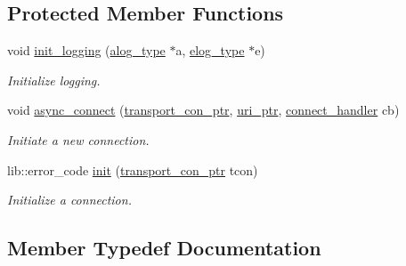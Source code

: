 \subsection*{Protected Member Functions}
\begin{DoxyCompactItemize}
\item 
void \mbox{\hyperlink{classwebsocketpp_1_1transport_1_1iostream_1_1endpoint_a0c3fbf85313521d6d3a9a53faa2084ae}{init\+\_\+logging}} (\mbox{\hyperlink{classwebsocketpp_1_1transport_1_1iostream_1_1endpoint_af176dc3a44caefab71de271c27873c81}{alog\+\_\+type}} $\ast$a, \mbox{\hyperlink{classwebsocketpp_1_1transport_1_1iostream_1_1endpoint_a0aafebd80866c13bef4caa45e48a8ede}{elog\+\_\+type}} $\ast$e)
\begin{DoxyCompactList}\small\item\em Initialize logging. \end{DoxyCompactList}\item 
void \mbox{\hyperlink{classwebsocketpp_1_1transport_1_1iostream_1_1endpoint_a72e24fecb98d0445eb7df64d6b94a6a8}{async\+\_\+connect}} (\mbox{\hyperlink{classwebsocketpp_1_1transport_1_1iostream_1_1endpoint_a709bba4a4e1e2b7829abe4aa55de8078}{transport\+\_\+con\+\_\+ptr}}, \mbox{\hyperlink{namespacewebsocketpp_aae370ea5ac83a8ece7712cb39fc23f5b}{uri\+\_\+ptr}}, \mbox{\hyperlink{namespacewebsocketpp_1_1transport_ac392fca34e946b48414278c0c3addfa5}{connect\+\_\+handler}} cb)
\begin{DoxyCompactList}\small\item\em Initiate a new connection. \end{DoxyCompactList}\item 
lib\+::error\+\_\+code \mbox{\hyperlink{classwebsocketpp_1_1transport_1_1iostream_1_1endpoint_a9e169a6551db86bd1147b314924bd353}{init}} (\mbox{\hyperlink{classwebsocketpp_1_1transport_1_1iostream_1_1endpoint_a709bba4a4e1e2b7829abe4aa55de8078}{transport\+\_\+con\+\_\+ptr}} tcon)
\begin{DoxyCompactList}\small\item\em Initialize a connection. \end{DoxyCompactList}\end{DoxyCompactItemize}


\subsection{Member Typedef Documentation}
\mbox{\label{classwebsocketpp_1_1transport_1_1iostream_1_1endpoint_a709bba4a4e1e2b7829abe4aa55de8078}} 
